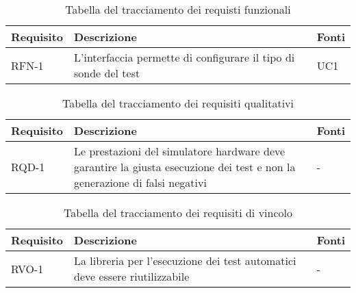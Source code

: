 \newpage

\begin{table}%
\caption{Tabella del tracciamento dei requisti funzionali}
\label{tab:requisiti-funzionali}
\begin{tabularx}{\textwidth}{lXl}
\hline\hline
\textbf{Requisito} & \textbf{Descrizione} & \textbf{Fonti}\\
\hline
RFN-1     & L'interfaccia permette di configurare il tipo di sonde del test & UC1 \\
\hline
\end{tabularx}
\end{table}%

\begin{table}%
\caption{Tabella del tracciamento dei requisiti qualitativi}
\label{tab:requisiti-qualitativi}
\begin{tabularx}{\textwidth}{lXl}
\hline\hline
\textbf{Requisito} & \textbf{Descrizione} & \textbf{Fonti}\\
\hline
RQD-1    & Le prestazioni del simulatore hardware deve garantire la giusta esecuzione dei test e non la generazione di falsi negativi & - \\
\hline
\end{tabularx}
\end{table}%

\begin{table}%
\caption{Tabella del tracciamento dei requisiti di vincolo}
\label{tab:requisiti-vincolo}
\begin{tabularx}{\textwidth}{lXl}
\hline\hline
\textbf{Requisito} & \textbf{Descrizione} & \textbf{Fonti}\\
\hline
RVO-1    & La libreria per l'esecuzione dei test automatici deve essere riutilizzabile & - \\
\hline
\end{tabularx}
\end{table}%